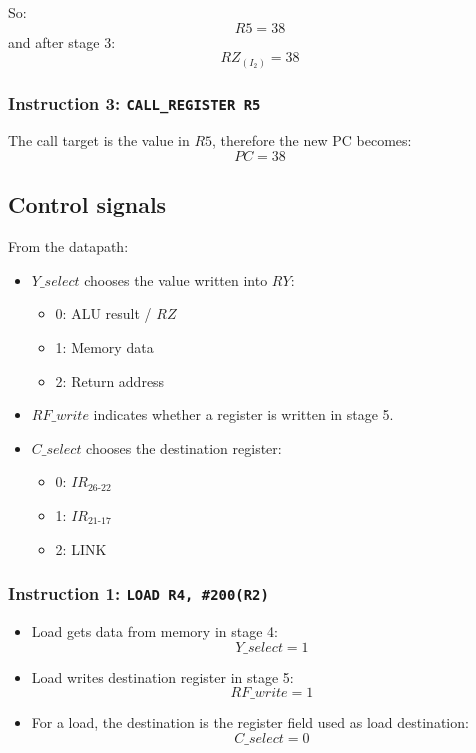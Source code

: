 \documentclass[12pt,a4paper]{article}
\begin{document}
So:
\[
\boxed{R5=38}
\]
and after stage 3:
\[
\boxed{RZ_{(I_2)} = 38}
\]

\subsubsection*{Instruction 3: \texttt{CALL\_REGISTER R5}}

The call target is the value in \(R5\), therefore the new PC becomes:
\[
\boxed{PC=38}
\]

\subsection*{Control signals}

From the datapath:
\begin{itemize}[leftmargin=2em]
    \item \(Y\_select\) chooses the value written into \(RY\):
    \begin{itemize}
        \item 0: ALU result / \(RZ\)
        \item 1: Memory data
        \item 2: Return address
    \end{itemize}
    \item \(RF\_write\) indicates whether a register is written in stage 5.
    \item \(C\_select\) chooses the destination register:
    \begin{itemize}
        \item 0: \(IR_{26\text{-}22}\)
        \item 1: \(IR_{21\text{-}17}\)
        \item 2: LINK
    \end{itemize}
\end{itemize}

\subsubsection*{Instruction 1: \texttt{LOAD R4, \#200(R2)}}

\begin{itemize}[leftmargin=2em]
    \item Load gets data from memory in stage 4:
    \[
    \boxed{Y\_select = 1}
    \]
    \item Load writes destination register in stage 5:
    \[
    \boxed{RF\_write = 1}
    \]
    \item For a load, the destination is the register field used as load destination:
    \[
    \boxed{C\_select = 0}
    \]
\end{itemize}
\end{document}
